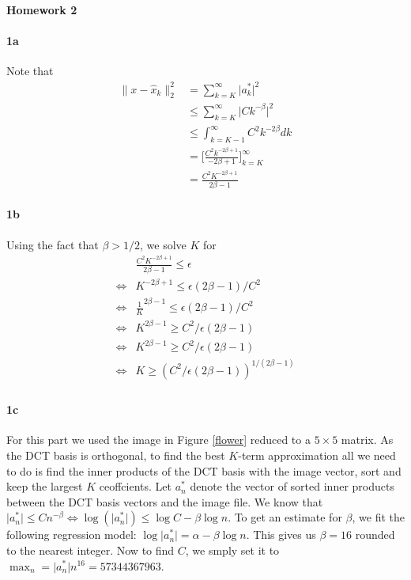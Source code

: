 \documentclass[12pt, leqno]{article}
\providecommand{\abs}[1]{\lvert#1\rvert} %
\providecommand{\norm}[1]{\lVert#1\rVert} %
\begin{document}
\pagestyle{fancy}

\begin{center}
{\large {\bf Homework 2}} \\
\end{center}

\paragraph{1a}
Note that 
\begin{align*}
\norm{x - \hat{x}_k}_2^2 &= \sum_{k = K}^{\infty} \abs{a_k^*}^2 \\
&\leq  \sum_{k = K}^{\infty} \abs{Ck^{-\beta}}^2 \\
&\leq  \int_{k = K-1}^{\infty} C^2 k^{-2\beta} dk \\
&= \Big[\frac{C^2 k^{-2 \beta + 1}}{-2 \beta + 1}\Big]_{k = K}^{\infty} \\
&= \frac{C^2 K^{- 2 \beta + 1}}{2 \beta - 1}
\end{align*}

\paragraph{1b}
Using the fact that $\beta>1/2$, we solve $K$ for 
\begin{align*}
&\frac{C^2 K^{- 2 \beta + 1}}{2 \beta - 1} \leq \epsilon \\
\iff& K^{- 2 \beta + 1} \leq  \epsilon (2 \beta - 1) / C^2 \\
\iff& \frac{1}{K}^{2 \beta - 1} \leq  \epsilon (2 \beta - 1) / C^2 \\
\iff& {K}^{2 \beta - 1} \geq  C^2 / \epsilon (2 \beta - 1) \\
\iff& {K}^{2 \beta - 1} \geq  C^2 / \epsilon (2 \beta - 1) \\
\iff& {K} \geq  (C^2 / \epsilon (2 \beta - 1))^{1/(2 \beta - 1)} \\
\end{align*}

\paragraph{1c}
For this part we used the image in Figure \ref{flower} reduced to a $5 \times 5$ matrix. As the DCT basis is orthogonal, to find the best $K$-term approximation all we need to do is find the inner products of the DCT basis with the image vector, sort and keep the largest $K$ ceoffcients. Let $a_n^*$ denote the vector of sorted inner products between the DCT basis vectors and the image file. We know that $\abs{a_n^*} \leq Cn^{-\beta} \iff \log(\abs{a_n^*}) \leq \log C  -\beta \log n $. To get an estimate for $\beta$, we fit the following regression model: ${\log{\abs{a_n^*}}} = \alpha - \beta \log n$. This gives us $\beta = 16$ rounded to the nearest integer. Now to find $C$, we smply set it to $\max_{n} = \abs{a_n^*} n^{16}= 57344367963$.
\end{document}
